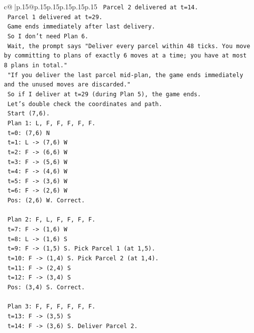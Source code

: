 \documentclass{article}
\begin{document}
{\begin{supertabular}{c@{$\;$}|p{.15\linewidth}@{}p{.15\linewidth}p{.15\linewidth}p{.15\linewidth}p{.15\linewidth}p{.15\linewidth}}
{{{\texttt{   Parcel 2 delivered at t=14.} \\
\texttt{   Parcel 1 delivered at t=29.} \\
\texttt{   Game ends immediately after last delivery.} \\
\texttt{   So I don't need Plan 6.} \\
\texttt{   Wait, the prompt says "Deliver every parcel within 48 ticks. You move by committing to plans of exactly 6 moves at a time; you have at most 8 plans in total."} \\
\texttt{   "If you deliver the last parcel mid{-}plan, the game ends immediately and the unused moves are discarded."} \\
\texttt{   So if I deliver at t=29 (during Plan 5), the game ends.} \\
\texttt{   Let's double check the coordinates and path.} \\
\texttt{   Start (7,6).} \\
\texttt{   Plan 1: L, F, F, F, F, F.} \\
\texttt{   t=0: (7,6) N} \\
\texttt{   t=1: L {-}> (7,6) W} \\
\texttt{   t=2: F {-}> (6,6) W} \\
\texttt{   t=3: F {-}> (5,6) W} \\
\texttt{   t=4: F {-}> (4,6) W} \\
\texttt{   t=5: F {-}> (3,6) W} \\
\texttt{   t=6: F {-}> (2,6) W} \\
\texttt{   Pos: (2,6) W. Correct.} \\
\\ 
\texttt{   Plan 2: F, L, F, F, F, F.} \\
\texttt{   t=7: F {-}> (1,6) W} \\
\texttt{   t=8: L {-}> (1,6) S} \\
\texttt{   t=9: F {-}> (1,5) S. Pick Parcel 1 (at 1,5).} \\
\texttt{   t=10: F {-}> (1,4) S. Pick Parcel 2 (at 1,4).} \\
\texttt{   t=11: F {-}> (2,4) S} \\
\texttt{   t=12: F {-}> (3,4) S} \\
\texttt{   Pos: (3,4) S. Correct.} \\
\\ 
\texttt{   Plan 3: F, F, F, F, F, F.} \\
\texttt{   t=13: F {-}> (3,5) S} \\
\texttt{   t=14: F {-}> (3,6) S. Deliver Parcel 2.} \\
}}}
\end{supertabular}}
\end{document}
